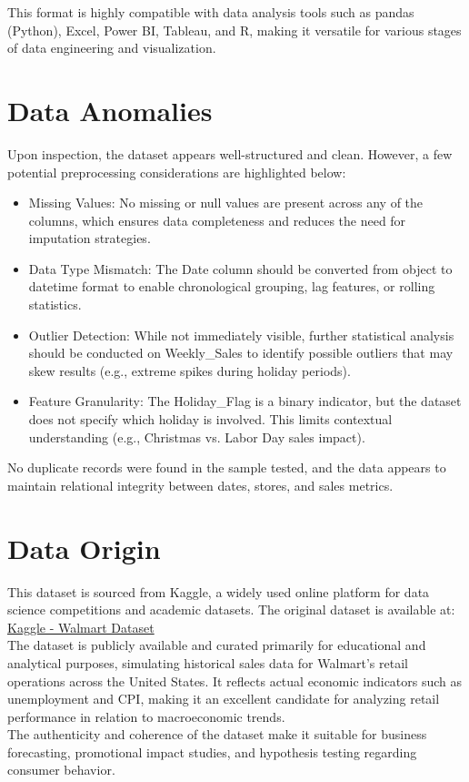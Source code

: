 This format is highly compatible with data analysis tools such as pandas (Python), Excel, Power BI, Tableau, and R, making it versatile for various stages of data engineering and visualization.


\section{Data Anomalies}

Upon inspection, the dataset appears well-structured and clean. However, a few potential preprocessing considerations are highlighted below: \medskip

\begin{itemize}
	\item Missing Values: No missing or null values are present across any of the columns, which ensures data completeness and reduces the need for imputation strategies.
	\item Data Type Mismatch: The Date column should be converted from object to datetime format to enable chronological grouping, lag features, or rolling statistics.
	\item Outlier Detection: While not immediately visible, further statistical analysis should be conducted on Weekly\_Sales to identify possible outliers that may skew results (e.g., extreme spikes during holiday periods).
	\item Feature Granularity: The Holiday\_Flag is a binary indicator, but the dataset does not specify which holiday is involved. This limits contextual understanding (e.g., Christmas vs. Labor Day sales impact).
\end{itemize}

No duplicate records were found in the sample tested, and the data appears to maintain relational integrity between dates, stores, and sales metrics.

\section{Data Origin}

This dataset is sourced from Kaggle, a widely used online platform for data science competitions and academic datasets. The original dataset is available at:\\

\href{https://www.kaggle.com/datasets/yasserh/walmart-dataset}{Kaggle - Walmart Dataset}\\

The dataset is publicly available and curated primarily for educational and analytical purposes, simulating historical sales data for Walmart's retail operations across the United States. It reflects actual economic indicators such as unemployment and CPI, making it an excellent candidate for analyzing retail performance in relation to macroeconomic trends.\\

The authenticity and coherence of the dataset make it suitable for business forecasting, promotional impact studies, and hypothesis testing regarding consumer behavior.